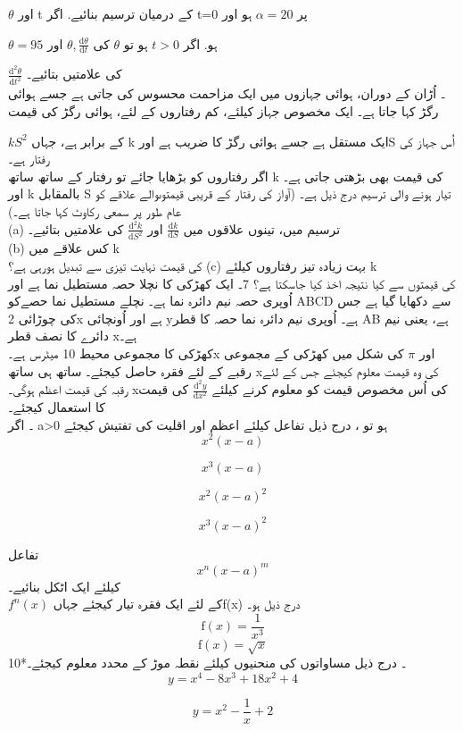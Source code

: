 \( \theta\)
اور
t
کے درمیان ترسیم بنائیے. 
اگر
t=0
  پر
  \( \alpha = 20\)
  ہو اور 

\( \theta = 95\)
ہو.
اگر
\( t > 0\)
ہو تو 
\( \theta\)
 کی 
 \( \theta, \frac{\text{d}\theta}{\text{d}t}\)
 اور 
 
\( \frac{\text{d}^2\theta}{\text{d}t^2}\)
کی علامتیں بتائیے۔ \\
۔ اُڑان کے دوران، ہوائی جہازوں میں ایک مزاحمت محسوس کی جاتی ہے جسے ہوائی رگڑ  کہا جاتا ہے۔ ایک مخصوص جہاز کیلئے، کم رفتاروں کے لئے، ہوائی رگڑ کی قیمت 

\( kS^2\)
کے برابر ہے، جہاں k  ایک مستقل ہے جسے ہوائی رگڑ کا ضریب  ہے اورS   اُس جہاز کی رفتار ہے۔ \\
اگر رفتاروں کو بڑھایا جائے تو رفتار کے ساتھ ساتھ k کی قیمت بھی بڑھتی جاتی ہے۔ اور k  بالمقابل S تیار ہونے والی ترسیم درج ذیل ہے۔ (آواز کی رفتار کے قریبی قیمتوںوالے علاقے  کو عام طور پر سمعی رکاوٹ  کہا جاتا ہے۔)\\
(a) ترسیم میں، تینوں علاقوں میں
\( \frac{\text{d}k}{\text{d}S}\)
اور
\( \frac{\text{d}^2k}{\text{d}S^2}\)
کی علامتیں بتائیے۔\\
(b) کس علاقے میں k  \\کی قیمت نہایت تیزی سے تبدیل ہورہی ہے؟
(c) بہت زیادہ تیز رفتاروں کیلئے  k \\کی قیمتوں سے کیا نتیجہ اخذ کیا جاسکتا ہے؟
7۔ ایک کھڑکی کا نچلا حصہ مستطیل نما ہے اور اُوپری حصہ نیم دائرہ نما ہے۔ نچلے مستطیل نما حصےکو ABCD سے دکھایا گیا ہے جس کی چوڑائی 2x  ہے اور اُونچائی  yہے۔ اُوپری نیم دائرہ نما حصہ کا قطر AB ہے، یعنی نیم دائرے کا نصف قطر  xہے۔ \\
	کھڑکی کا مجموعی محیط 10 میٹرس ہے۔x  اور
\(\pi\)
  کی شکل میں کھڑکی کے مجموعی رقبے کے لئے فقرہ حاصل کیجئے۔ ساتھ ہی ساتھ  xکی وہ قیمت معلوم کیجئے جس کے لئے رقبہ کی قیمت اعظم ہوگی۔  xکی اُس مخصوص قیمت کو معلوم کرنے کیلئے
 \( \frac{\text{d}^2y}{\text{d}x^2}\)
   کی قیمت کا استعمال کیجئے۔ \\
۔ اگر   a>0   ہو تو ، درج ذیل تفاعل کیلئے اعظم اور اقلیت کی تفتیش کیجئے \\

\[x^2(x-a)\]

\[x^3(x-a)\]

\[x^2(x-a)^2\]

\[x^3(x-a)^2\]


تفاعل 
\[x^n(x-a)^m\]
 کیلئے ایک اٹکل  بنائیے۔ \\
 \(f^{n}(x)\)
 کے لئے ایک فقرہ تیار کیجئے جہاںf(x)  درج ذیل ہو۔ \\
\[\text{f}(x) = \frac{1}{x^3}\]
\[\text{f}(x) = \sqrt{x}\]
10*۔ درج  ذیل مساواتوں کی منحنیوں کیلئے نقطہ موڑ کے محدد  معلوم کیجئے۔ \\

\[y = x^4 - 8x^3 + 18x^2 + 4\]

\[y = x^2 - \frac{1}{x} + 2\]

